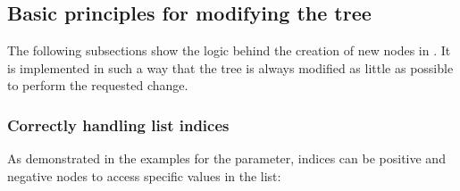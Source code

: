 \documentclass[a4paper,10pt,english]{sphinxmanual}
\begin{document}
\subsection{Basic principles for modifying the tree}
\label{\detokenize{README:basic-principles-for-modifying-the-tree}}
\sphinxAtStartPar
The following subsections show the logic behind the creation of new nodes in . It is implemented in such a way that the tree is always modified as little as possible to perform the requested change.


\subsubsection{Correctly handling list indices}
\label{\detokenize{README:correctly-handling-list-indices}}
\sphinxAtStartPar
As demonstrated in the examples for the {\hyperref[\detokenize{README:the-path-parameter}]{}}\sphinxhyphen{}parameter,  indices can be positive and negative \sphinxhyphen{}nodes to access specific values in the list:

\begin{sphinxVerbatim}[commandchars=\\\{\},numbers=left,firstnumber=1,stepnumber=1]
  \PYG{p}{[}\PYG{p}{[}\PYG{p}{[} \PYG{p}{]} \PYG{p}{]} \PYG{p}{[}  \PYG{p}{[} \PYG{p}{[} \PYG{p}{]}\PYG{p}{]} \PYG{p}{]}\PYG{p}{]}  
\PYG{p}{[}\PYG{p}{]}  
\PYG{p}{[}\PYG{p}{]}    
\end{sphinxVerbatim}
\end{document}
